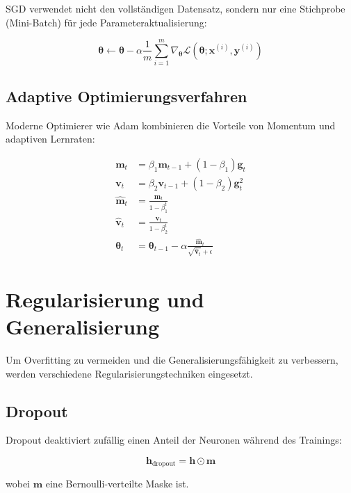 SGD verwendet nicht den vollständigen Datensatz, sondern nur eine Stichprobe (Mini-Batch) für jede Parameteraktualisierung:

\begin{equation}
\mathbf{\theta} \leftarrow \mathbf{\theta} - \alpha \frac{1}{m} \sum_{i=1}^{m} \nabla_{\mathbf{\theta}} \mathcal{L}(\mathbf{\theta}; \mathbf{x}^{(i)}, \mathbf{y}^{(i)})
\end{equation}

\subsection{Adaptive Optimierungsverfahren}

Moderne Optimierer wie Adam kombinieren die Vorteile von Momentum und adaptiven Lernraten:

\begin{align}
\mathbf{m}_t &= \beta_1 \mathbf{m}_{t-1} + (1 - \beta_1) \mathbf{g}_t \\
\mathbf{v}_t &= \beta_2 \mathbf{v}_{t-1} + (1 - \beta_2) \mathbf{g}_t^2 \\
\hat{\mathbf{m}}_t &= \frac{\mathbf{m}_t}{1 - \beta_1^t} \\
\hat{\mathbf{v}}_t &= \frac{\mathbf{v}_t}{1 - \beta_2^t} \\
\mathbf{\theta}_t &= \mathbf{\theta}_{t-1} - \alpha \frac{\hat{\mathbf{m}}_t}{\sqrt{\hat{\mathbf{v}}_t} + \epsilon}
\end{align}

\section{Regularisierung und Generalisierung}

Um Overfitting zu vermeiden und die Generalisierungsfähigkeit zu verbessern, werden verschiedene Regularisierungstechniken eingesetzt.

\subsection{Dropout}

Dropout deaktiviert zufällig einen Anteil der Neuronen während des Trainings:

\begin{equation}
\mathbf{h}_{\text{dropout}} = \mathbf{h} \odot \mathbf{m}
\end{equation}

wobei $\mathbf{m}$ eine Bernoulli-verteilte Maske ist.

